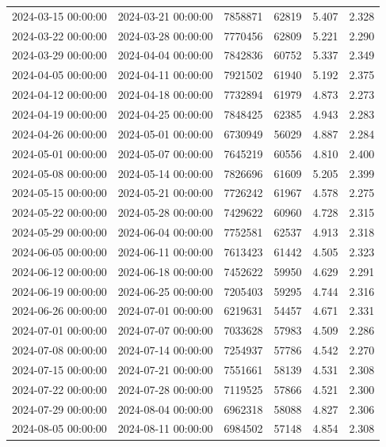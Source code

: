 \begin{tabular}{llrrrr}
2024-03-15 00:00:00 & 2024-03-21 00:00:00 & 7858871 & 62819 & 5.407 & 2.328 \\
2024-03-22 00:00:00 & 2024-03-28 00:00:00 & 7770456 & 62809 & 5.221 & 2.290 \\
2024-03-29 00:00:00 & 2024-04-04 00:00:00 & 7842836 & 60752 & 5.337 & 2.349 \\
2024-04-05 00:00:00 & 2024-04-11 00:00:00 & 7921502 & 61940 & 5.192 & 2.375 \\
2024-04-12 00:00:00 & 2024-04-18 00:00:00 & 7732894 & 61979 & 4.873 & 2.273 \\
2024-04-19 00:00:00 & 2024-04-25 00:00:00 & 7848425 & 62385 & 4.943 & 2.283 \\
2024-04-26 00:00:00 & 2024-05-01 00:00:00 & 6730949 & 56029 & 4.887 & 2.284 \\
2024-05-01 00:00:00 & 2024-05-07 00:00:00 & 7645219 & 60556 & 4.810 & 2.400 \\
2024-05-08 00:00:00 & 2024-05-14 00:00:00 & 7826696 & 61609 & 5.205 & 2.399 \\
2024-05-15 00:00:00 & 2024-05-21 00:00:00 & 7726242 & 61967 & 4.578 & 2.275 \\
2024-05-22 00:00:00 & 2024-05-28 00:00:00 & 7429622 & 60960 & 4.728 & 2.315 \\
2024-05-29 00:00:00 & 2024-06-04 00:00:00 & 7752581 & 62537 & 4.913 & 2.318 \\
2024-06-05 00:00:00 & 2024-06-11 00:00:00 & 7613423 & 61442 & 4.505 & 2.323 \\
2024-06-12 00:00:00 & 2024-06-18 00:00:00 & 7452622 & 59950 & 4.629 & 2.291 \\
2024-06-19 00:00:00 & 2024-06-25 00:00:00 & 7205403 & 59295 & 4.744 & 2.316 \\
2024-06-26 00:00:00 & 2024-07-01 00:00:00 & 6219631 & 54457 & 4.671 & 2.331 \\
2024-07-01 00:00:00 & 2024-07-07 00:00:00 & 7033628 & 57983 & 4.509 & 2.286 \\
2024-07-08 00:00:00 & 2024-07-14 00:00:00 & 7254937 & 57786 & 4.542 & 2.270 \\
2024-07-15 00:00:00 & 2024-07-21 00:00:00 & 7551661 & 58139 & 4.531 & 2.308 \\
2024-07-22 00:00:00 & 2024-07-28 00:00:00 & 7119525 & 57866 & 4.521 & 2.300 \\
2024-07-29 00:00:00 & 2024-08-04 00:00:00 & 6962318 & 58088 & 4.827 & 2.306 \\
2024-08-05 00:00:00 & 2024-08-11 00:00:00 & 6984502 & 57148 & 4.854 & 2.308 \\

\end{tabular}
